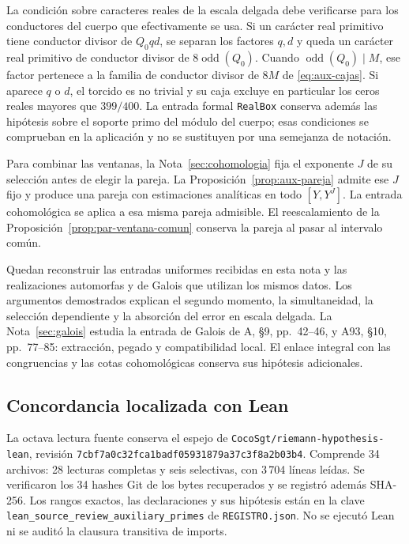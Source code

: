 La condición sobre caracteres reales de la escala delgada debe
verificarse para los conductores del cuerpo que efectivamente se usa.
Si un carácter real primitivo tiene conductor divisor de $Q_0qd$,
se separan los factores $q,d$ y queda un carácter real primitivo de
conductor divisor de $8\operatorname{odd}(Q_0)$.
Cuando $\operatorname{odd}(Q_0)\mid M$, ese factor pertenece a la
familia de conductor divisor de $8M$ de \eqref{eq:aux-cajas}.
Si aparece $q$ o $d$, el torcido es no trivial y su caja excluye en
particular los ceros reales mayores que $399/400$.
La entrada formal \texttt{RealBox} conserva además las hipótesis sobre
el soporte primo del módulo del cuerpo; esas condiciones se comprueban
en la aplicación y no se sustituyen por una semejanza de notación.

Para combinar las ventanas, la Nota~\ref{sec:cohomologia} fija el
exponente $J$ de su selección antes de elegir la pareja. La
Proposición~\ref{prop:aux-pareja} admite ese $J$ fijo y produce
una pareja con estimaciones analíticas en todo $[Y,Y^J]$.
La entrada cohomológica se aplica a esa misma pareja admisible.
El reescalamiento de la Proposición~\ref{prop:par-ventana-comun}
conserva la pareja al pasar al intervalo común.

Quedan reconstruir las entradas uniformes recibidas en esta nota y
las realizaciones automorfas y de Galois que utilizan los mismos datos.
Los argumentos demostrados explican el segundo momento, la simultaneidad,
la selección dependiente y la absorción del error en escala delgada.
La Nota~\ref{sec:galois} estudia la entrada de Galois de A, §9,
pp.~42--46, y A93, §10, pp.~77--85: extracción, pegado y
compatibilidad local. El enlace integral con las congruencias
y las cotas cohomológicas conserva sus hipótesis adicionales.


\subsection{Concordancia localizada con Lean}
\label{subsec:aux-lean}

La octava lectura fuente conserva el espejo de
\texttt{CocoSgt/riemann-hypothesis-lean}, revisión
\nolinkurl{7cbf7a0c32fca1badf05931879a37c3f8a2b03b4}.
Comprende 34 archivos: 28 lecturas completas y seis selectivas,
con 3\,704 líneas leídas. Se verificaron los 34 hashes Git de los
bytes recuperados y se registró además SHA-256. Los rangos exactos,
las declaraciones y sus hipótesis están en la clave
\texttt{lean\_source\_review\_auxiliary\_primes} de
\texttt{REGISTRO.json}. No se ejecutó Lean ni se auditó la clausura
transitiva de imports.

